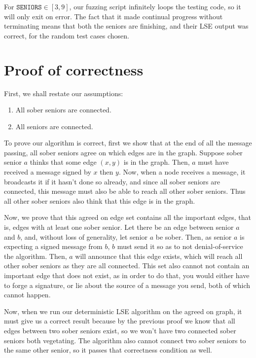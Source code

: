 \documentclass[a4paper]{scrartcl}
\begin{document}
For \(\texttt{SENIORS} \in [3, 9]\), our fuzzing script infinitely loops the testing code, so it will only exit on error. The fact that it made continual progress without terminating means that both the seniors are finishing, and their LSE output was correct, for the random test cases chosen.

\section{Proof of correctness}
First, we shall restate our assumptions:

\begin{enumerate}
\item All sober seniors are connected.
\item All seniors are connected.
\end{enumerate}

To prove our algorithm is correct, first we show that at the end of all the message passing, all sober seniors agree on which edges are in the graph. Suppose sober senior \(a\) thinks that some edge \((x, y)\) is in the graph. Then, \(a\) must have received a message signed by \(x\) then \(y\). Now, when a node receives a message, it broadcasts it if it hasn't done so already, and since all sober seniors are connected, this message must also be able to reach all other sober seniors. Thus all other sober seniors also think that this edge is in the graph.

Now, we prove that this agreed on edge set contains all the important edges, that is, edges with at least one sober senior. Let there be an edge between senior \(a\) and \(b\), and, without loss of generality, let senior \(a\) be sober. Then, as senior \(a\) is expecting a signed message from \(b\), \(b\) must send it so as to not denial-of-service the algorithm. Then, \(a\) will announce that this edge exists, which will reach all other sober seniors as they are all connected. This set also cannot not contain an important edge that does not exist, as in order to do that, you would either have to forge a signature, or lie about the source of a message you send, both of which cannot happen.

Now, when we run our deterministic LSE algorithm on the agreed on graph, it must give us a correct result because by the previous proof we know that all edges between two sober seniors exist, so we won't have two connected sober seniors both vegetating. The algorithm also cannot connect two sober seniors to the same other senior, so it passes that correctness condition as well.
\end{document}
